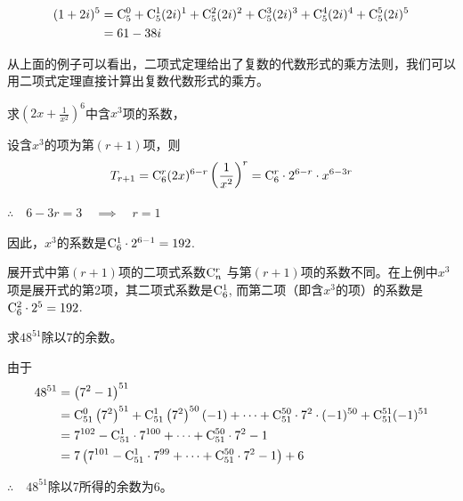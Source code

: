 \begin{solution}
\[\begin{split}
  (1+2i)^{5}&=\comb{5}{0}+\comb{5}{1}(2i)^{1}+\comb{5}{2}(2i)^{2}+\comb{5}{3}(2i)^{3}+\comb{5}{4}(2i)^{4}+\comb{5}{5}(2i)^{5}\\
  &=61-38i
\end{split}\]
\end{solution}


从上面的例子可以看出，二项式定理给出了复数的代数形式的乘方法则，我们可以用二项式定理直接计算出复数代数形式的乘方。

\begin{example}
求$\left(2x+\frac{1}{x^{2}}\right)^{6} $中含$ x^{3} $项的系数，
\end{example}

\begin{solution}
设含$x^{3} $的项为第$( r+1 )$项，则
\[T_{r+1}=\comb{6}{r}(2x)^{6-r}\left(\frac{1}{x^{2}}\right)^{r}=\comb{6}{r}\cdot  2^{6-r}\cdot  x^{6-3r}\]

$\therefore\quad 6-3r=3\quad \implies \quad r=1$

因此，$x^{3} $的系数是$\comb{6}{1}\cdot  2^{6-1}=192$.
\end{solution}

\begin{remark}
展开式中第$( r+1 )$项的二项式系数$\comb{n}{r}$ 与第$( r+1 )$项的系数不同。在上例中$ x^{3} $项是展开式的第2项，其二项式系数是$\comb{6}{1}$, 而第二项（即含$ x^{3} $的项）的系数是$\comb{6}{2}\cdot  2^{5}=192$.    
\end{remark}

\begin{example}
    求$48^{51}$除以7的余数。
\end{example}

\begin{solution}
由于
\[\begin{split}
48^{51}&=\left(7^{2}-1\right)^{51}\\
& =\comb{51}{0}\left(7^{2}\right)^{51}+\comb{51}{1}\left(7^{2}\right)^{50}(-1)+\cdots +\comb{51}{50}\cdot  7^{2}\cdot (-1)^{50}+\comb{51}{51}(-1)^{51}\\
& =7^{102}-\comb{51}{1}\cdot  7^{100}+\cdots +\comb{51}{50}\cdot  7^{2}-1\\
&=7\left(7^{101}-\comb{51}{1}\cdot  7^{99}+\cdots+\comb{51}{50}\cdot  7^{2}-1\right)+6    
\end{split}\]

$\therefore\quad  48^{51} $除以7所得的余数为6。
\end{solution}

